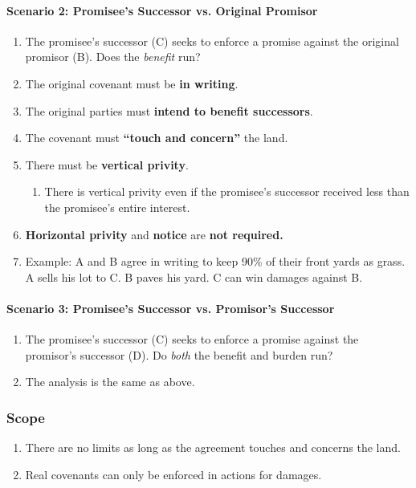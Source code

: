 \paragraph{Scenario 2: Promisee's Successor vs. Original Promisor}

\begin{enumerate}
    \item The promisee's successor (C) seeks to enforce a promise against the 
    original promisor (B). Does the \emph{benefit} run?
    \item The original covenant must be \textbf{in writing}.
    \item The original parties must \textbf{intend to benefit successors}.
    \item The covenant must \textbf{``touch and concern''} the land.
    \item There must be \textbf{vertical privity}.
    \begin{enumerate}
        \item There is vertical privity even if the promisee's successor 
        received less than the promisee's entire interest.
    \end{enumerate}
    \item \textbf{Horizontal privity} and \textbf{notice} are \textbf{not 
    required.}
    \item Example: A and B agree in writing to keep 90\% of their front yards 
    as grass. A sells his lot to C. B paves his yard. C can win damages 
    against B.
\end{enumerate}

\paragraph{Scenario 3: Promisee's Successor vs. Promisor's Successor}

\begin{enumerate}
    \item The promisee's successor (C) seeks to enforce a promise against the 
    promisor's successor (D). Do \emph{both} the benefit and burden run?
    \item The analysis is the same as above.
\end{enumerate}

\subsubsection{Scope}

\begin{enumerate}
    \item There are no limits as long as the agreement touches and concerns 
    the land.
    \item Real covenants can only be enforced in actions for damages.
\end{enumerate}

